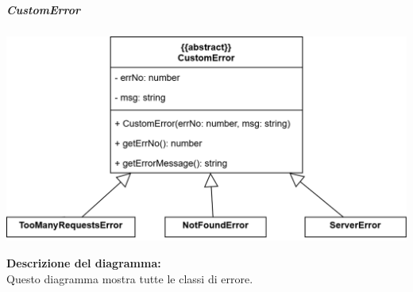 \subparagraph{CustomError}
\begin{center}
      \includegraphics[scale=0.3]{template/images/uml_front/logic/CustomError.png}
\end{center}
\textbf{Descrizione del diagramma:}\\
Questo diagramma mostra tutte le classi di errore.
